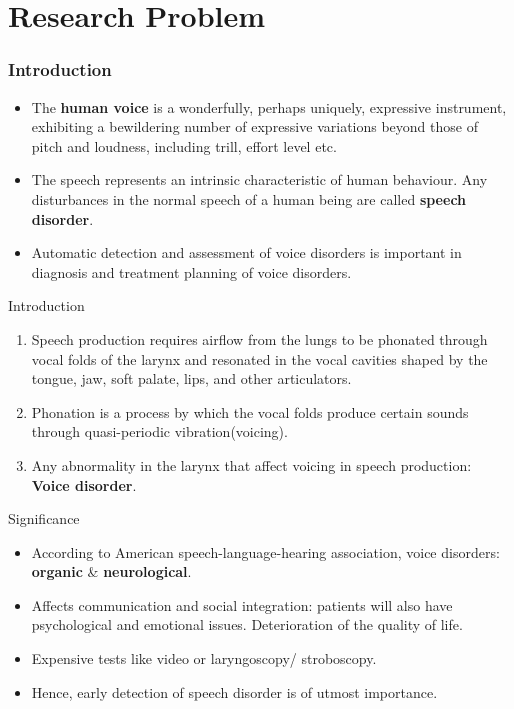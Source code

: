 \documentclass{beamer}
\begin{document}
\section{Research Problem} 
\begin{frame}
\frametitle{Introduction}
\begin{itemize}
    \item The \textbf{human voice} is a wonderfully, perhaps uniquely, expressive instrument, exhibiting a bewildering number of expressive variations beyond those of pitch and loudness, including trill, effort level etc.
    \item The speech represents an intrinsic characteristic of human behaviour. Any disturbances in the normal speech of a human being are called \textbf{speech disorder}.
    \item Automatic detection and assessment of voice disorders is important in diagnosis and treatment planning of voice disorders.
\end{itemize}
\end{frame}
\begin{frame}{Introduction}
    \begin{enumerate}
    [square]
        \item Speech production requires airflow from the lungs to be phonated through vocal folds of the larynx and resonated in the vocal cavities shaped by the tongue, jaw, soft palate, lips, and other articulators. 
        \item Phonation is a process by which the vocal folds produce certain sounds through quasi-periodic vibration(voicing).
        \item Any abnormality in the larynx that affect voicing in speech production: \textbf{Voice disorder}.
    \end{enumerate}
\end{frame}
\begin{frame}{Significance}
\begin{itemize}
    \item According to American speech-language-hearing association, voice disorders: \textbf{organic} \& \textbf{neurological}.
    \item Affects communication and social integration: patients will also have psychological and emotional issues. Deterioration of the quality of life.
    \item Expensive tests like video or laryngoscopy/ stroboscopy.
    \item Hence, early detection of speech disorder is of utmost importance.
\end{itemize}
\end{frame}
\end{document}
